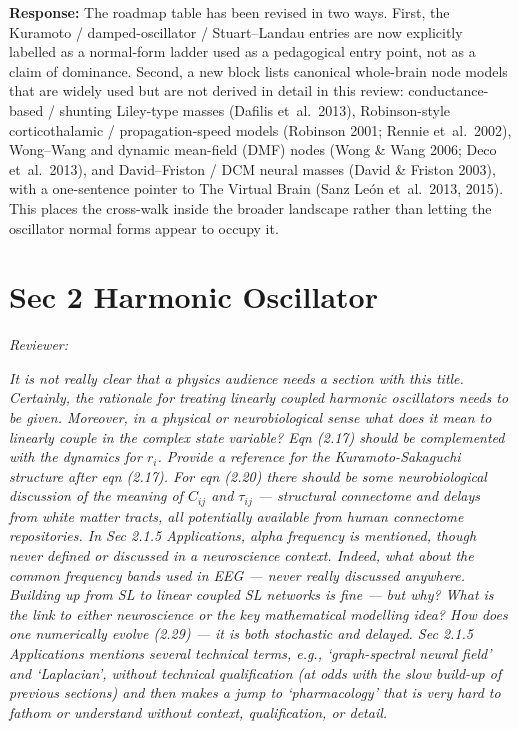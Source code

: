 \documentclass[12pt,a4paper]{article}
\newcommand{\reviewercomment}[1]{\par\smallskip\noindent\textit{Reviewer:}\par\smallskip\begingroup\itshape #1\par\endgroup\smallskip}
\newcommand{\ourresponse}[1]{\par\noindent\textbf{Response:} #1\par\medskip}
\begin{document}
\ourresponse{The roadmap table has been revised in two ways. First, the Kuramoto / damped-oscillator / Stuart--Landau entries are now explicitly labelled as a normal-form ladder used as a pedagogical entry point, not as a claim of dominance. Second, a new block lists canonical whole-brain node models that are widely used but are not derived in detail in this review: conductance-based / shunting Liley-type masses (Dafilis et~al.~2013), Robinson-style corticothalamic / propagation-speed models (Robinson 2001; Rennie et~al.~2002), Wong--Wang and dynamic mean-field (DMF) nodes (Wong \& Wang 2006; Deco et~al.~2013), and David--Friston / DCM neural masses (David \& Friston 2003), with a one-sentence pointer to The Virtual Brain (Sanz Le\'on et~al.~2013, 2015). This places the cross-walk inside the broader landscape rather than letting the oscillator normal forms appear to occupy it.}

\section*{Sec 2 Harmonic Oscillator}

\reviewercomment{It is not really clear that a physics audience needs a section with this title. Certainly, the rationale for treating linearly coupled harmonic oscillators needs to be given. Moreover, in a physical or neurobiological sense what does it mean to linearly couple in the complex state variable? Eqn (2.17) should be complemented with the dynamics for $r_i$. Provide a reference for the Kuramoto-Sakaguchi structure after eqn (2.17). For eqn (2.20) there should be some neurobiological discussion of the meaning of $C_{ij}$ and $\tau_{ij}$ --- structural connectome and delays from white matter tracts, all potentially available from human connectome repositories. In Sec 2.1.5 Applications, alpha frequency is mentioned, though never defined or discussed in a neuroscience context. Indeed, what about the common frequency bands used in EEG --- never really discussed anywhere. Building up from SL to linear coupled SL networks is fine --- but why? What is the link to either neuroscience or the key mathematical modelling idea? How does one numerically evolve (2.29) --- it is both stochastic and delayed. Sec 2.1.5 Applications mentions several technical terms, e.g., `graph-spectral neural field' and `Laplacian', without technical qualification (at odds with the slow build-up of previous sections) and then makes a jump to `pharmacology' that is very hard to fathom or understand without context, qualification, or detail.}
\end{document}
